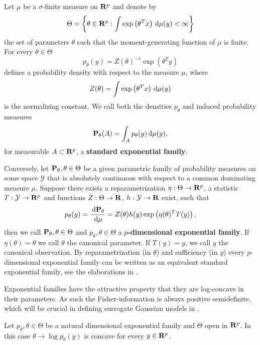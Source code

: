 \begin{definition}
    Let $\mu$ be a $\sigma$-finite measure on $\R^{p}$ and denote by 
    $$\Theta = \left\{\theta \in \R^{p} : \int \exp \left( \theta^{T} x \right) \d\mu(y) < \infty\right\}$$
    the set of parameters $\theta$ such that the moment-generating function of $\mu$ is finite. 
    For every $\theta \in \Theta$ $$p_{\theta}(y) = Z(\theta)^{-1} \exp (\theta^{T} y)$$ defines a probability density with respect to the measure $\mu$, where $$Z(\theta) = \int \exp \left( \theta^{T} x \right) \d\mu(y)$$ is the normalizing constant. 
    We call both the densities $p_{\theta}$ and induced probability measures $$ \P_{\theta} (A) = \int_{A} p_{\theta}(y) \d \mu(y),$$ for measurable $A \subset \R^{p}$, a \textbf{standard exponential family}.

    Conversely, let $\P_{\theta}, \theta \in \Theta$ be a given parametric family of probability measures on some space $\mathcal Y$ that is absolutely continuous with respect to a common dominating measure $\mu$. Suppose there exists a reparametrization $\eta : \Theta \to \R^{p}$, a statistic $T: \mathcal Y \to \R^{p}$ and functions $Z: \Theta\to \R$, $h:\mathcal Y \to \R$ exist, such that
    $$
        p_{\theta}(y) = \frac{\d \P_{\theta}}{\d \mu} = Z(\theta) h(y) \exp \left(\eta(\theta)^{T}T(y)\right),
    $$
    then we call $\P_{\theta}, \theta \in \Theta$ and $p_{\theta}, \theta \in \Theta$ a \textbf{$p$-dimensional exponential family}. If $\eta(\theta) = \theta$ we call $\theta$ the canonical parameter. If $T(y) = y$, we call $y$ the canonical observation. By reparametrization (in $\theta$) and sufficiency (in $y$) every $p$-dimensional exponential family can be written as an equivalent standard exponential family, see the elaborations in \cite[Chapter 1]{Brown1986Fundamentals}.
\end{definition}

\begin{definition}

\end{definition}
    
Exponential families have the attractive property that they are log-concave in their parameters. As such the Fisher-information is always positive semidefinite, which will be crucial in defining surrogate Gaussian models in .
\begin{lemma}
    Let $p_{\theta}, \theta \in \Theta$ be a natural dimensional exponential family and $\Theta$ open in $\R^{p}$. In this case $\theta \to \log p_{\theta}(y)$ is concave for every $y \in \R^{p}$.
\end{lemma}


